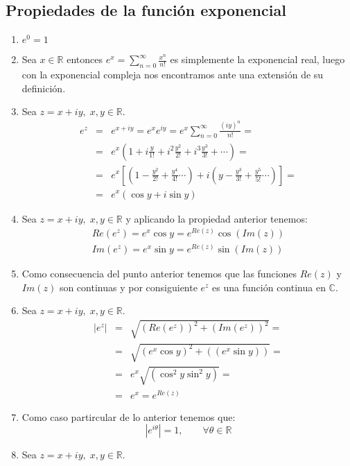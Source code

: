 \subsection{Propiedades de la función exponencial}
\begin{enumerate}
  \item \(e^0=1\)
  \item Sea \(x\in \mathbb{R}\) entonces \(e^x=\sum\limits_{n=0}^{\infty}\frac{x^n}{n!}\) es simplemente la exponencial real, luego con la exponencial compleja nos encontramos ante una extensión de su definición.
  \item Sea \(z=x+iy, \; x,y\in \mathbb{R}\).
    \begin{eqnarray*}
      e^z & = & e^{x+iy}=e^xe^{iy}=e^x\sum\limits_{n=0}^{\infty}\frac{(iy)^n}{n!}= \\
          & = & e^x\left( 1+i\frac{y}{1!}+i^2\frac{y^2}{2!}+i^3\frac{y^3}{3!}+ \cdots \right) = \\
          & = & e^x\left[ \left( 1-\frac{y^2}{2!}+\frac{y^4}{4!} \cdots \right) + i\left( y-\frac{y^3}{3!}+\frac{y^5}{5!} \cdots \right)\right] = \\
          & = & e^x(\cos{y}+i\sin{y})
    \end{eqnarray*}
  \item Sea \(z=x+iy, \; x,y\in \mathbb{R}\) y aplicando la propiedad anterior tenemos:
    \begin{eqnarray*}
      Re(e^z)=e^x\cos{y}=e^{Re(z)}\cos(Im(z)) \\
      Im(e^z)=e^x\sin{y}=e^{Re(z)}\sin(Im(z))
    \end{eqnarray*} 
  \item Como consecuencia del punto anterior tenemos que las funciones \(Re(z)\) y \(Im(z)\) son continuas y por consiguiente \(e^z\) es una función continua en \(\mathbb{C}\).
  \item Sea \(z=x+iy, \; x,y\in \mathbb{R}\).
    \begin{eqnarray*}
      |e^z| & = & \sqrt{(Re(e^z))^2+(Im(e^z))^2} =  \\
            & = & \sqrt{(e^x\cos{y})^2+((e^x\sin{y}))} = \\
            & = & e^x \sqrt{(\cos^2{y}\sin^2{y})} = \\
            & = & e^x = e^{Re(z)}
    \end{eqnarray*} 
  \item Como caso partircular de lo anterior tenemos que:
    \[ |e^{i\theta} | = 1, \qquad \forall \theta \in \mathbb{R} \]
  \item Sea \(z=x+iy, \; x,y\in \mathbb{R}\).

\end{enumerate}

